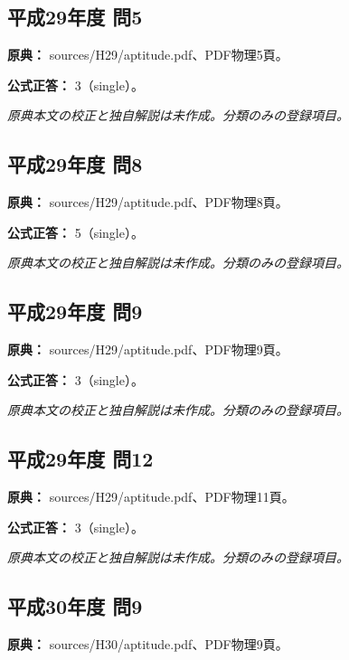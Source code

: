 \subsection{平成29年度 問5}
\label{q:h29-reg-apt-05}

\noindent\textbf{原典：} sources/H29/aptitude.pdf、PDF物理5頁。

\textbf{公式正答：} 3（single）。

\par\textit{原典本文の校正と独自解説は未作成。分類のみの登録項目。}

\subsection{平成29年度 問8}
\label{q:h29-reg-apt-08}

\noindent\textbf{原典：} sources/H29/aptitude.pdf、PDF物理8頁。

\textbf{公式正答：} 5（single）。

\par\textit{原典本文の校正と独自解説は未作成。分類のみの登録項目。}

\subsection{平成29年度 問9}
\label{q:h29-reg-apt-09}

\noindent\textbf{原典：} sources/H29/aptitude.pdf、PDF物理9頁。

\textbf{公式正答：} 3（single）。

\par\textit{原典本文の校正と独自解説は未作成。分類のみの登録項目。}

\subsection{平成29年度 問12}
\label{q:h29-reg-apt-12}

\noindent\textbf{原典：} sources/H29/aptitude.pdf、PDF物理11頁。

\textbf{公式正答：} 3（single）。

\par\textit{原典本文の校正と独自解説は未作成。分類のみの登録項目。}

\subsection{平成30年度 問9}
\label{q:h30-reg-apt-09}

\noindent\textbf{原典：} sources/H30/aptitude.pdf、PDF物理9頁。

